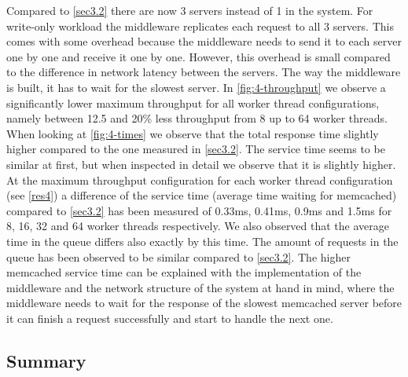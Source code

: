 \documentclass[11pt,a4paper]{article}
\begin{document}
Compared to \autoref{sec3.2} there are now 3 servers instead of 1 in the system. For write-only workload the middleware replicates each request to all 3 servers. This comes with some overhead because the middleware needs to send it to each server one by one and receive it one by one. However, this overhead is small compared to the difference in network latency between the servers. The way the middleware is built, it has to wait for the slowest server. 
In \autoref{fig:4-throughput} we observe a significantly lower maximum throughput for all worker thread configurations, namely between 12.5 and 20\% less throughput from 8 up to 64 worker threads. When looking at \autoref{fig:4-times} we observe that the total response time slightly higher compared to the one measured in \autoref{sec3.2}. The service time seems to be similar at first, but when inspected in detail we observe that it is slightly higher.
At the maximum throughput configuration for each worker thread configuration (see \autoref{res4}) a difference of the service time (average time waiting for memcached) compared to \autoref{sec3.2} has been measured of 0.33ms, 0.41ms, 0.9ms and 1.5ms for 8, 16, 32 and 64 worker threads respectively. We also observed that the average time in the queue differs also exactly by this time. The amount of requests in the queue has been observed to be similar compared to \autoref{sec3.2}. The higher memcached service time can be explained with the implementation of the middleware and the network structure of the system at hand in mind, where the middleware needs to wait for the response of the slowest memcached server before it can finish a request successfully and start to handle the next one.



\subsection{Summary}
\end{document}
